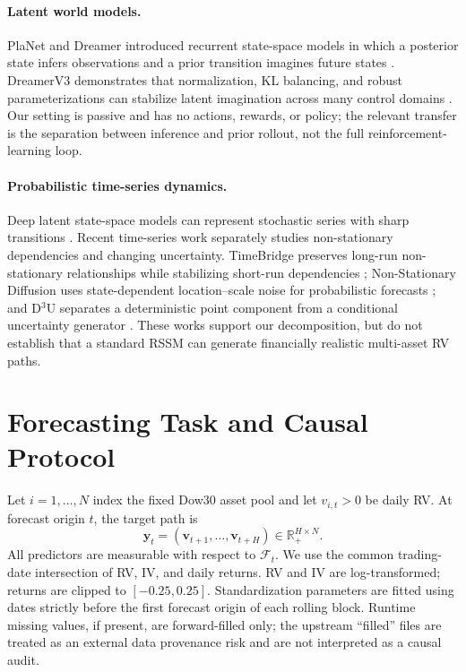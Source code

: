 \documentclass[11pt]{article}
\newcommand{\cF}{\mathcal F}
\begin{document}
\paragraph{Latent world models.} PlaNet and Dreamer introduced recurrent state-space models in which a posterior state infers observations and a prior transition imagines future states \cite{hafner2019,hafner2025}. DreamerV3 demonstrates that normalization, KL balancing, and robust parameterizations can stabilize latent imagination across many control domains \cite{hafner2025}. Our setting is passive and has no actions, rewards, or policy; the relevant transfer is the separation between inference and prior rollout, not the full reinforcement-learning loop.

\paragraph{Probabilistic time-series dynamics.} Deep latent state-space models can represent stochastic series with sharp transitions \cite{zhou2023}. Recent time-series work separately studies non-stationary dependencies and changing uncertainty. TimeBridge preserves long-run non-stationary relationships while stabilizing short-run dependencies \cite{liu2025}; Non-Stationary Diffusion uses state-dependent location--scale noise for probabilistic forecasts \cite{ye2025}; and D$^3$U separates a deterministic point component from a conditional uncertainty generator \cite{li2025}. These works support our decomposition, but do not establish that a standard RSSM can generate financially realistic multi-asset RV paths.

\section{Forecasting Task and Causal Protocol}

Let $i=1,\ldots,N$ index the fixed Dow30 asset pool and let $v_{i,t}>0$ be daily RV. At forecast origin $t$, the target path is
\begin{equation}
    \mathbf y_t=(\mathbf v_{t+1},\ldots,\mathbf v_{t+H})\in\mathbb R_+^{H\times N}.
\end{equation}
All predictors are measurable with respect to $\cF_t$. We use the common trading-date intersection of RV, IV, and daily returns. RV and IV are log-transformed; returns are clipped to $[-0.25,0.25]$. Standardization parameters are fitted using dates strictly before the first forecast origin of each rolling block. Runtime missing values, if present, are forward-filled only; the upstream ``filled'' files are treated as an external data provenance risk and are not interpreted as a causal audit.
\end{document}
